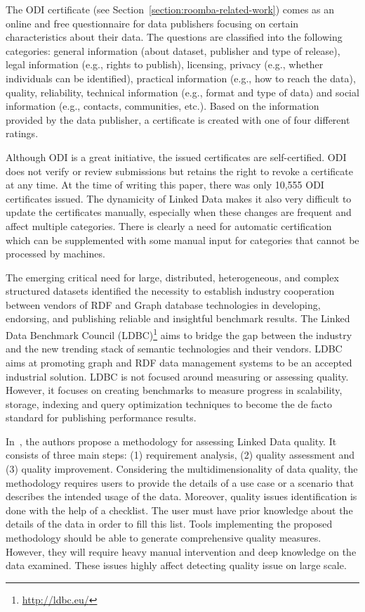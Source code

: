 The ODI certificate (see Section~\ref{section:roomba-related-work}) comes as an online and free questionnaire for data publishers focusing on certain characteristics about their data. The questions are classified into the following categories: general information (about dataset, publisher and type of release), legal information (e.g., rights to publish), licensing, privacy (e.g., whether individuals can be identified), practical information (e.g., how to reach the data), quality, reliability, technical information (e.g., format and type of data) and social information (e.g., contacts, communities, etc.). Based on the information provided  by the data  publisher, a certificate is created with one of four different ratings.

Although ODI is a great initiative, the issued certificates are self-certified. ODI does not verify or review submissions but retains the right to revoke a certificate at any time. At the time of writing this paper, there was only 10,555 ODI certificates issued. The dynamicity of Linked Data  makes it also very difficult to update the certificates manually, especially when these changes are frequent and affect multiple categories. There is clearly a need for automatic certification which can be supplemented with some manual input for categories that cannot be processed by machines.

The emerging critical need for large, distributed, heterogeneous, and complex structured datasets identified the necessity to establish industry cooperation between vendors of RDF and Graph database technologies in developing, endorsing, and publishing reliable and insightful benchmark results. The Linked Data Benchmark Council (LDBC)\footnote{\url{http://ldbc.eu/}} aims to bridge the gap between the industry and the new trending stack of semantic technologies and their vendors. LDBC aims at promoting graph and RDF data management systems to be an accepted industrial solution. LDBC is not focused around measuring or assessing quality. However, it focuses on creating benchmarks to measure progress in scalability, storage, indexing and query optimization techniques to become the de facto standard for publishing performance results.

In~\cite{Anisa:LDQ:14}, the authors propose a methodology for assessing Linked Data quality. It consists of three main steps: (1) requirement analysis, (2) quality assessment and (3) quality improvement. Considering the multidimensionality of data quality, the methodology requires users to provide the details of a use case or a scenario that describes the intended usage of the data. Moreover, quality issues identification is done with the help of a checklist. The user must have prior knowledge about the details of the data in order to fill this list. Tools implementing the proposed methodology should be able to generate comprehensive quality measures. However, they will require heavy manual intervention and deep knowledge on the data examined. These issues highly affect detecting quality issue on large scale.

